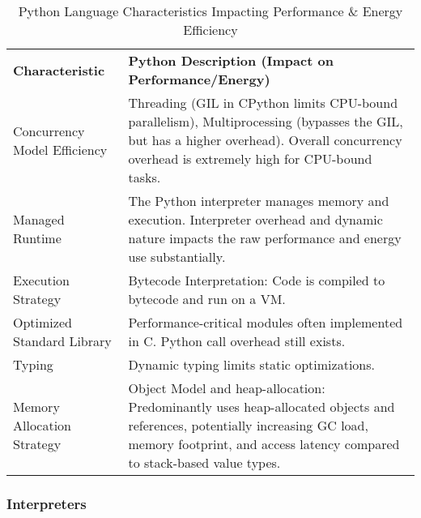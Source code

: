 \begin{table}[h]
	\centering
	\caption{Python Language Characteristics Impacting Performance \& Energy Efficiency}
	\label{tab:python_energy_characteristics}
	\begin{tabular}{
		>{\raggedright\arraybackslash}p{} %
		>{\raggedright\arraybackslash}p{}  %
	}
		\toprule
		\multicolumn{2}{c}{\textbf{Characteristics Impacting Performance \& Energy Efficiency}} \\
		\midrule
		\textbf{Characteristic}                 & \textbf{Python Description (Impact on Performance/Energy)}\\
		\midrule
		Concurrency Model Efficiency            & Threading (\gls{GIL} in \gls{CPython} limits CPU-bound parallelism), Multiprocessing (bypasses the \gls{GIL}, but has a higher overhead). Overall concurrency overhead is extremely high for CPU-bound tasks. \\
		\addlinespace
		Managed Runtime                         & The Python interpreter manages memory and execution. Interpreter overhead and dynamic nature impacts the raw performance and energy use substantially. \\
		\addlinespace
		Execution Strategy                      & Bytecode Interpretation: Code is compiled to bytecode and run on a \gls{VM}. \\
		\addlinespace
		Optimized Standard Library              & Performance-critical modules often implemented in C. Python call overhead still exists. \\
		\addlinespace
		Typing                                  & Dynamic typing limits static optimizations. \\
		\addlinespace
		Memory Allocation Strategy              & Object Model and \gls{heap-allocation}: Predominantly uses heap-allocated objects and references, potentially increasing \gls{GC} load, memory footprint, and access latency compared to stack-based value types. \\
		\bottomrule
	\end{tabular}
\end{table}


\subsubsection{Interpreters}



